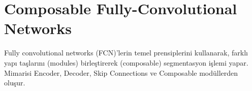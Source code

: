 \section{Composable Fully-Convolutional Networks}

Fully convolutional networks (FCN)'lerin temel prensiplerini kullanarak, farklı yapı taşlarını (modules) birleştirerek (composable) segmentasyon işlemi yapar. Mimarisi Encoder, Decoder, Skip Connections ve Composable modüllerden oluşur. 

\newpage
